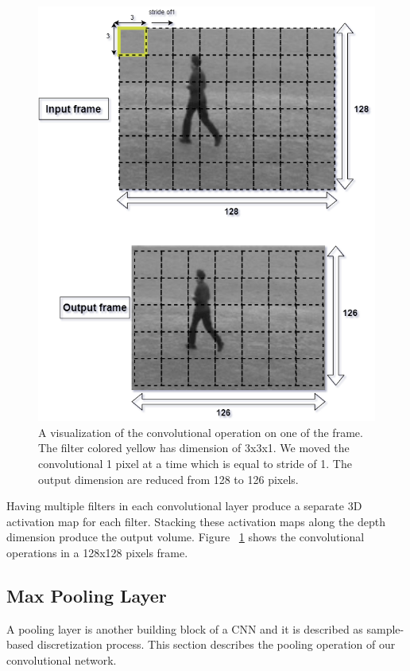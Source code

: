\begin{figure}[ht]
\centering
\includegraphics[width=0.8\columnwidth]{Figures/d1.png}
\decoRule
\caption[A visualization of the convolutional operation on one of the frame. The filter colored yellow has dimension of 3x3x1. We moved the convolutional 1 pixel at a time which is equal to stride of 1.]{A visualization of the convolutional operation on one of the frame. The filter colored yellow has dimension of 3x3x1. We moved the convolutional 1 pixel at a time which is equal to stride of 1. The output dimension are reduced from 128 to 126 pixels.}
\label{fig:la2la22}
\end{figure}

Having multiple filters in each convolutional layer produce a separate 3D activation map for each filter. Stacking these activation maps along the depth dimension produce the output volume. Figure ~\ref{fig:la2la22} shows the convolutional operations in a 128x128 pixels frame.

\subsection{Max Pooling Layer}
\hspace{5mm} A pooling layer is another building block of a CNN and it is described as sample-based discretization process. This section describes the pooling operation of our convolutional network.\\

